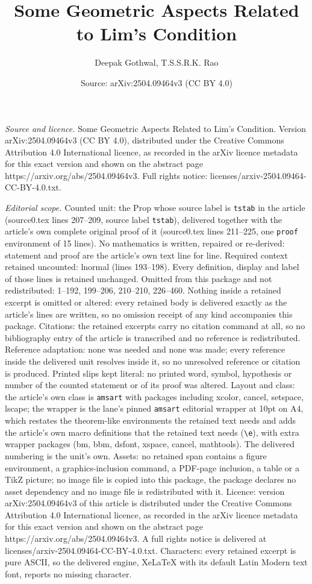 \documentclass[10pt,a4paper]{amsart}
\title[Some Geometric Aspects Related to Lim's Condition]{Some Geometric Aspects Related to Lim's Condition}
\author{Deepak Gothwal, T.S.S.R.K. Rao}
\date{Source: arXiv:2504.09464v3 (CC BY 4.0)}
\begin{document}
\maketitle

\noindent\emph{Source and licence.} Some Geometric Aspects Related to Lim's Condition. Version arXiv:2504.09464v3 (CC BY 4.0), distributed under the Creative Commons Attribution 4.0 International licence, as recorded in the arXiv licence metadata for this exact version and shown on the abstract page https://arxiv.org/abs/2504.09464v3. Full rights notice: licenses/arxiv-2504.09464-CC-BY-4.0.txt.\par\smallskip

\noindent\textit{Editorial scope.} Counted unit: the Prop whose source label is \texttt{tstab} in the article (source0.tex lines 207--209, source label \texttt{tstab}), delivered together with the article's own complete original proof of it (source0.tex lines 211--225, one \texttt{proof} environment of 15 lines). No mathematics is written, repaired or re-derived: statement and proof are the article's own text line for line. Required context retained uncounted: lnormal (lines 193--198). Every definition, display and label of those lines is retained unchanged. Omitted from this package and not redistributed: 1--192, 199--206, 210--210, 226--460. Nothing inside a retained excerpt is omitted or altered: every retained body is delivered exactly as the article's lines are written, so no omission receipt of any kind accompanies this package. Citations: the retained excerpts carry no citation command at all, so no bibliography entry of the article is transcribed and no reference is redistributed. Reference adaptation: none was needed and none was made; every reference inside the delivered unit resolves inside it, so no unresolved reference or citation is produced. Printed slips kept literal: no printed word, symbol, hypothesis or number of the counted statement or of its proof was altered. Layout and class: the article's own class is \texttt{amsart} with packages including xcolor, cancel, setspace, lscape; the wrapper is the lane's pinned \texttt{amsart} editorial wrapper at 10pt on A4, which restates the theorem-like environments the retained text needs and adds the article's own macro definitions that the retained text needs (\texttt{\textbackslash e}), with extra wrapper packages (bm, bbm, dsfont, xspace, cancel, mathtools). The delivered numbering is the unit's own. Assets: no retained span contains a figure environment, a graphics-inclusion command, a PDF-page inclusion, a table or a TikZ picture; no image file is copied into this package, the package declares no asset dependency and no image file is redistributed with it. Licence: version arXiv:2504.09464v3 of this article is distributed under the Creative Commons Attribution 4.0 International licence, as recorded in the arXiv licence metadata for this exact version and shown on the abstract page https://arxiv.org/abs/2504.09464v3. A full rights notice is delivered at licenses/arxiv-2504.09464-CC-BY-4.0.txt. Characters: every retained excerpt is pure ASCII, so the delivered engine, XeLaTeX with its default Latin Modern text font, reports no missing character.
\end{document}
